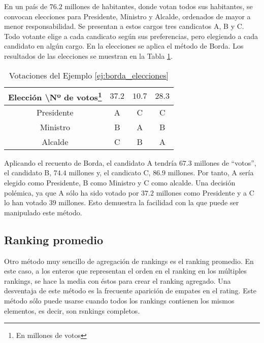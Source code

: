 \begin{ejemplo}\label{ej:borda_elecciones} 

En un país de $76.2$ millones de habitantes, donde votan todos sus habitantes, se convocan elecciones para Presidente, Ministro y Alcalde, ordenados de mayor a menor responsabilidad. Se presentan a estos cargos tres candicatos A, B y C. Todo votante elige a cada candicato según sus preferencias, pero elegiendo a cada candidato en algún cargo. En la elecciones se aplica el método de Borda. Los resultados de las elecciones se muestran en la Tabla \ref{tbl:borda_elecciones}.\\
 
\begin{savenotes}
\begin{table}[h]
\centering
\caption{Votaciones del Ejemplo \ref{ej:borda_elecciones}}
\label{tbl:borda_elecciones}
\begin{tabular}{@{}cccc@{}}
\toprule
Elección \textbackslash Nº de votos\footnote{En millones de votos} & $37.2$ & $10.7$ & $28.3$ \\ \midrule
Presidente           & A    & C    & C    \\
Ministro             & B    & A    & B    \\
Alcalde              & C    & B    & A    \\ \bottomrule
\end{tabular}
\end{table}
\end{savenotes}

Aplicando el recuento de Borda, el candidato A tendría $67.3$ millones de ``votos'', el candidato B, $74.4$ millones y, el candicato C, $86.9$ millones. Por tanto, A sería elegido como Presidente, B como Ministro y C como alcalde. Una decisión polémica, ya que A sólo ha sido votado por $37.2$ millones como Presidente y a C lo han votado $39$ millones. Esto demuestra la facilidad con la que puede ser manipulado este método.  

\end{ejemplo}

\subsection{Ranking promedio}
Otro método muy sencillo de agregación de rankings es el ranking promedio. En este caso, a los enteros que representan el orden en el ranking en los múltiples rankings, se hace la media con éstos para crear el ranking agregado. Una desventaja de este método es la frecuente aparición de empates en el rating. Este método sólo puede usarse cuando todos los rankings contienen los mismos elementos, es decir, son rsnkings completos. 

